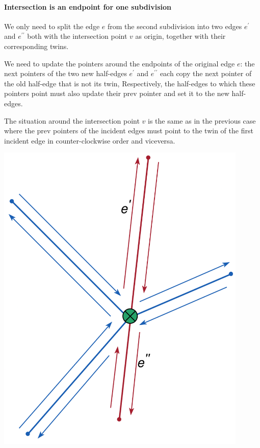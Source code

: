 \begin{minipage}{0.7\textwidth}
    \paragraph*{Intersection is an endpoint for one subdivision}
    We only need to split the edge $e$ from the second subdivision into two edges $e^{\prime}$ and $e^{\prime\prime}$ both with the intersection point $v$ as origin, together with their corresponding twins.

    We need to update the pointers around the endpoints of the original edge $e$: the next pointers of the two new half-edges $e^{\prime}$ and $e^{\prime\prime}$ each copy the next pointer of the old half-edge that is not its twin, Respectively, the half-edges to which these pointers point must also update their prev pointer and set it to the new half-edges.

    The situation around the intersection point $v$ is the same as in the previous case where the prev pointers of the incident edges must point to the twin of the first incident edge in counter-clockwise order and viceversa.
\end{minipage}\hfill
\begin{minipage}{0.3\textwidth}
    \centering
    \includegraphics[width=0.9\textwidth]{images/int1.png}
\end{minipage}
\break

